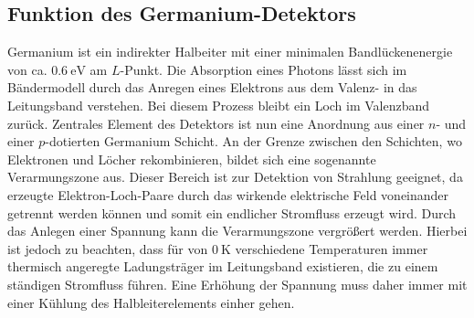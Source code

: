 \subsection{Funktion des Germanium-Detektors}
Germanium ist ein indirekter Halbeiter mit einer minimalen Bandlückenenergie von ca. $\SI{0.6}{\electronvolt}$ am $L$-Punkt. 
Die Absorption eines Photons lässt sich im Bändermodell durch das Anregen eines Elektrons aus dem Valenz- in das 
Leitungsband verstehen. Bei diesem Prozess bleibt ein Loch im Valenzband zurück. Zentrales Element des Detektors ist nun 
eine Anordnung aus einer $n$- und einer $p$-dotierten Germanium Schicht. An der Grenze zwischen den Schichten, wo Elektronen 
und Löcher rekombinieren, bildet sich eine sogenannte Verarmungszone aus. Dieser Bereich ist zur Detektion von Strahlung 
geeignet, da erzeugte Elektron-Loch-Paare durch das wirkende elektrische Feld voneinander getrennt werden können und somit ein 
endlicher Stromfluss erzeugt wird. Durch das Anlegen einer Spannung kann die Verarmungszone vergrößert werden. Hierbei ist jedoch 
zu beachten, dass für von $\SI{0}{\kelvin}$ verschiedene Temperaturen immer thermisch angeregte Ladungsträger im Leitungsband existieren, die 
zu einem ständigen Stromfluss führen. Eine Erhöhung der Spannung muss daher immer mit einer Kühlung des 
Halbleiterelements einher gehen.

